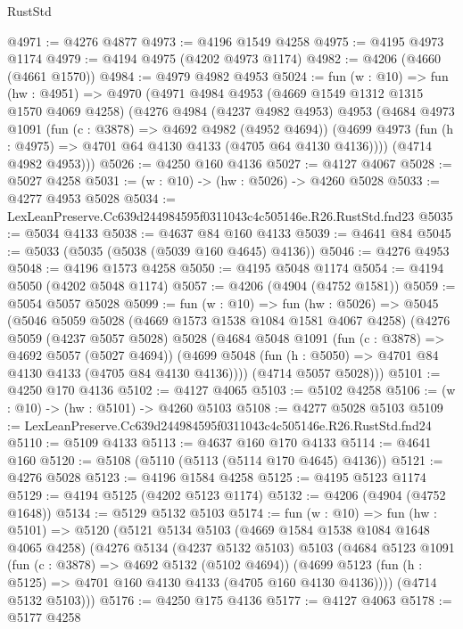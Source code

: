 \begin{lexlean}{RustStd}
\begin{coremodule}
@4971 := @4276 @4877
@4973 := @4196 @1549 @4258
@4975 := @4195 @4973 @1174
@4979 := @4194 @4975 (@4202 @4973 @1174)
@4982 := @4206 (@4660 (@4661 @1570))
@4984 := @4979 @4982 @4953
@5024 := fun (w : @10) =>
  fun (hw : @4951) =>
  @4970
    (@4971
      @4984
      @4953
      (@4669 @1549 @1312 @1315 @1570 @4069 @4258)
      (@4276
        @4984
        (@4237 @4982 @4953)
        @4953
        (@4684
          @4973
          @1091
          (fun (c : @3878) => @4692 @4982 (@4952 @4694))
          (@4699 @4973 (fun (h : @4975) => @4701 @64 @4130 @4133 (@4705 @64 @4130 @4136))))
        (@4714 @4982 @4953)))
@5026 := @4250 @160 @4136
@5027 := @4127 @4067
@5028 := @5027 @4258
@5031 := (w : @10) -> (hw : @5026) -> @4260 @5028
@5033 := @4277 @4953 @5028
@5034 := LexLeanPreserve.Cc639d244984595f0311043c4c505146e.R26.RustStd.fnd23
@5035 := @5034 @4133
@5038 := @4637 @84 @160 @4133
@5039 := @4641 @84
@5045 := @5033 (@5035 (@5038 (@5039 @160 @4645) @4136))
@5046 := @4276 @4953
@5048 := @4196 @1573 @4258
@5050 := @4195 @5048 @1174
@5054 := @4194 @5050 (@4202 @5048 @1174)
@5057 := @4206 (@4904 (@4752 @1581))
@5059 := @5054 @5057 @5028
@5099 := fun (w : @10) =>
  fun (hw : @5026) =>
  @5045
    (@5046
      @5059
      @5028
      (@4669 @1573 @1538 @1084 @1581 @4067 @4258)
      (@4276
        @5059
        (@4237 @5057 @5028)
        @5028
        (@4684
          @5048
          @1091
          (fun (c : @3878) => @4692 @5057 (@5027 @4694))
          (@4699 @5048 (fun (h : @5050) => @4701 @84 @4130 @4133 (@4705 @84 @4130 @4136))))
        (@4714 @5057 @5028)))
@5101 := @4250 @170 @4136
@5102 := @4127 @4065
@5103 := @5102 @4258
@5106 := (w : @10) -> (hw : @5101) -> @4260 @5103
@5108 := @4277 @5028 @5103
@5109 := LexLeanPreserve.Cc639d244984595f0311043c4c505146e.R26.RustStd.fnd24
@5110 := @5109 @4133
@5113 := @4637 @160 @170 @4133
@5114 := @4641 @160
@5120 := @5108 (@5110 (@5113 (@5114 @170 @4645) @4136))
@5121 := @4276 @5028
@5123 := @4196 @1584 @4258
@5125 := @4195 @5123 @1174
@5129 := @4194 @5125 (@4202 @5123 @1174)
@5132 := @4206 (@4904 (@4752 @1648))
@5134 := @5129 @5132 @5103
@5174 := fun (w : @10) =>
  fun (hw : @5101) =>
  @5120
    (@5121
      @5134
      @5103
      (@4669 @1584 @1538 @1084 @1648 @4065 @4258)
      (@4276
        @5134
        (@4237 @5132 @5103)
        @5103
        (@4684
          @5123
          @1091
          (fun (c : @3878) => @4692 @5132 (@5102 @4694))
          (@4699 @5123 (fun (h : @5125) => @4701 @160 @4130 @4133 (@4705 @160 @4130 @4136))))
        (@4714 @5132 @5103)))
@5176 := @4250 @175 @4136
@5177 := @4127 @4063
@5178 := @5177 @4258

\end{coremodule}
\end{lexlean}
